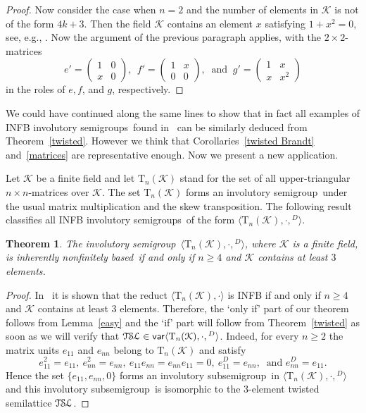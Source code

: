 \documentclass[11pt,reqno]{amsart}
\newcommand{\sgp}{semi\-group}
\newcommand{\is}{involutory semi\-group}
\newcommand{\iss}{involutory semi\-groups}
\newcommand{\infb}{inherently non\-finitely based}
\newcommand{\TSL}{\ensuremath{\mathcal{T\kern-.5pt S\kern-.5pt L}}}
\newtheorem{Thm}{Theorem}[section]
\DeclareMathOperator{\var}{\mathsf{var}}
\begin{document}
\begin{proof}
Now consider the case when $n=2$ and the number of elements in $\mathcal{K}$ is not of the form $4k+3$. Then the field $\mathcal{K}$
contains an element $x$ satisfying $1+x^2=0$, see, e.g., \cite[Theorem~3.75]{LidlNiederreiter}. Now the argument of the previous paragraph
applies, with the $2\times 2$-matrices
$$e'=\begin{pmatrix}
1 & 0 \\
x & 0
\end{pmatrix},\ \ f'=
\begin{pmatrix}
1 & x\\
0 & 0
\end{pmatrix},\ \text{ and }\
g'=
\begin{pmatrix}
1 & x \\
x & x^2
\end{pmatrix}$$
in the roles of $e,f$, and $g$, respectively.
\end{proof}

We could have continued along the same lines to show that in fact all examples of INFB \iss\ found in~\cite{Dolinka:2010,ADV:2012} can be
similarly deduced from Theorem~\ref{twisted}. However we think that Corollaries~\ref{twisted Brandt} and~\ref{matrices} are representative
enough. Now we present a new application.

Let $\mathcal{K}$ be a finite field and let $\mathrm{T}_n(\mathcal{K})$ stand for the set of all upper-triangular $n\times n$-matrices over
$\mathcal{K}$. The set $\mathrm{T}_n(\mathcal{K})$ forms an \is\ under the usual matrix multiplication and the skew transposition. The
following result classifies all INFB \iss\ of the form $\langle\mathrm{T}_n(\mathcal{K}),\cdot,{}^D\rangle$.

\begin{Thm}
\label{triangular} The \is\ $\langle\mathrm{T}_n(\mathcal{K}),\cdot,{}^D\rangle$, where $\mathcal{K}$ is a finite field, is \infb\ if and
only if $n\ge 4$ and $\mathcal{K}$ contains at least $3$ elements.
\end{Thm}

\begin{proof}
In~\cite{Goldberg&Volkov:2003} it is shown that the reduct $\langle\mathrm{T}_n(\mathcal{K}),\cdot\rangle$ is INFB if and only if $n\ge 4$
and $\mathcal{K}$ contains at least $3$ elements. Therefore, the `only if' part of our theorem follows from Lemma~\ref{easy} and the `if'
part will follow from Theorem~\ref{twisted} as soon as we will verify that $\TSL\in\var\langle\mathrm{T}_n(\mathcal{K}),\cdot,{}^D\rangle$.
Indeed, for every $n\ge2$ the matrix units $e_{11}$ and $e_{nn}$ belong to $\mathrm{T}_n(\mathcal{K})$ and satisfy
$$e_{11}^2=e_{11},\ e_{nn}^2=e_{nn},\ e_{11}e_{nn}=e_{nn}e_{11}=0,\ e_{11}^D=e_{nn},\ \text{ and } e_{nn}^D=e_{11}.$$
Hence the set $\{e_{11},e_{nn},0\}$ forms an involutory sub\sgp\ in $\langle\mathrm{T}_n(\mathcal{K}),\cdot,{}^D\rangle$ and this
involutory sub\sgp\ is isomorphic to the 3-element twisted semilattice $\TSL$.
\end{proof}
\end{document}
